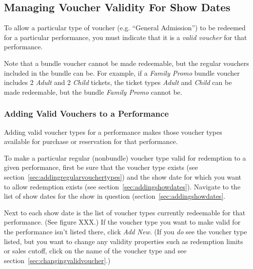 
\subsection{Managing Voucher Validity For Show Dates}

To allow a particular type of voucher (e.g. ``General Admission'') to be
redeemed for a particular performance, you must indicate that it is a
\emph{valid voucher} for that performance.


Note that a bundle voucher cannot be made redeemable, but the regular
vouchers included in the bundle can be.  For example, if a \emph{Family
Promo} bundle voucher includes 2 \emph{Adult} and 2 \emph{Child} tickets, the
ticket types \emph{Adult} and \emph{Child} can be made redeemable, but the
bundle \emph{Family Promo} cannot be.

\subsubsection{Adding Valid Vouchers to a Performance}
\label{sec:addingvalidvouchers}

Adding valid voucher types for a performance makes those voucher types
available for purchase or reservation for that performance.

To make a particular regular (nonbundle) voucher type valid for
redemption to a given performance, first be sure that the voucher type
exists (see section~\ref{sec:addingregularvouchertypes}) and the show
date for which you want to allow redemption exists (see
section~\ref{sec:addingshowdates}).  Navigate to the list of show dates
for the show in question (section~\ref{sec:addingshowdates}.

Next to each show date is the list of voucher types currently redeemable
for that performance.  (See figure XXX.)  If the voucher type you want
to make valid for the performance isn't listed there, click \emph{Add
  New}.  (If you \emph{do} see the voucher type listed, but you want to
change any validity properties such as redemption limits or sales
cutoff, click on the name of the voucher type and see
section~\ref{sec:changingvalidvoucher}.) 

